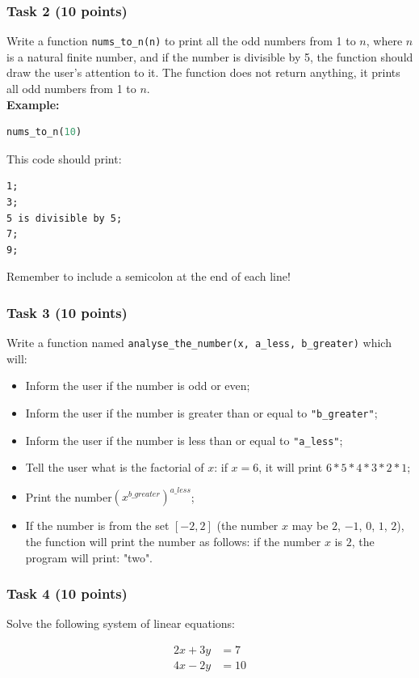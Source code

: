 \documentclass[12pt]{article}
\begin{document}
\subsubsection{Task 2 (10 points)}
Write a function \texttt{nums\_to\_n(n)} to print all the odd numbers from 1 to $n$, where $n$ is a natural finite number, and if the number is divisible by 5, the function should draw the user's attention to it. The function does not return anything, it prints all odd numbers from 1 to $n$. \\
\textbf{Example:}
\begin{lstlisting}[language=Python]
nums_to_n(10)
\end{lstlisting}
This code should print:
\begin{verbatim}
1;
3;
5 is divisible by 5;
7;
9;
\end{verbatim}
Remember to include a semicolon at the end of each line!

\subsubsection{Task 3 (10 points)}
Write a function named \texttt{analyse\_the\_number(x, a\_less, b\_greater)} which will:
\begin{itemize}
\item Inform the user if the number is odd or even;
\item Inform the user if the number is greater than or equal to \texttt{"b\_greater"};
\item Inform the user if the number is less than or equal to \texttt{"a\_less"};
\item Tell the user what is the factorial of $x$: if $x = 6$, it will print $6*5*4*3*2*1$;
\item Print the number$(x^{b\_greater})^{a\_less}$;
\item If the number is from the set $[-2, 2]$ (the number $x$ may be $2$, $-1$, $0$, $1$, $2$), the function will print the number as follows: if the number $x$ is $2$, the program will print: "two".
\end{itemize}

\subsubsection{Task 4 (10 points)}


Solve the following system of linear equations:

\[
\begin{align*}
2x + 3y &= 7 \\
4x - 2y &= 10 \\
\end{align*}
\]
\end{document}
